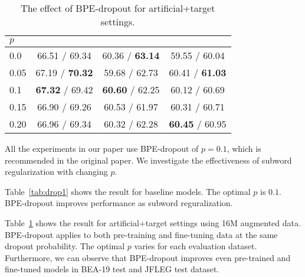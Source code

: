 \documentclass[11pt]{article}
\begin{document}
\begin{table}[t]
	\scriptsize
	\centering
	\tabcolsep 4pt
	\begin{tabular}{lccc}
		\hline
		$p$
		& \hspace{-1em}{$\def\arraystretch{0.5}\begin{array}{c}\vspace{-0.5em}\\\text{BEA-19}\\\text{test}\\\end{array}$}\hspace{-1em}
		& \hspace{-1em}{$\def\arraystretch{0.5}\begin{array}{c}\vspace{-0.5em}\\\text{CoNLL}\\\text{14}\\\end{array}$}\hspace{-1em}
		& \hspace{-1em}{$\def\arraystretch{0.5}\begin{array}{c}\vspace{-0.5em}\\\text{JFLEG}\\\text{test}\\\end{array}$}\hspace{-1em}
		\\ \hline
		0.0
		& 66.51 / 69.34
		& 60.36 / \textbf{63.14}
		& 59.55 / 60.04 \\
		0.05
		& 67.19 / \textbf{70.32}
		& 59.68 / 62.73
		& 60.41 / \textbf{61.03} \\
		0.1
		& \textbf{67.32} / 69.42
		& \textbf{60.60} / 62.25
		& 60.12 / 60.69 \\
		0.15
		& 66.90 / 69.26
		& 60.53 / 61.97
		& 60.31 / 60.71 \\
		0.20
		& 66.96 / 69.34
		& 60.32 / 62.28
		& \textbf{60.45} / 60.95 \\
		\hline
	\end{tabular}
	\caption{The effect of BPE-dropout for artificial+target settings.}
	\label{tab:drop2}
\end{table}

All the experiments in our paper use BPE-dropout of $p=0.1$, which is recommended in the original paper.
We investigate the effectiveness of subword regularization with changing $p$.

Table~\ref{tab:drop1} shows the result for baseline models.
The optimal $p$ is $0.1$.
BPE-dropout improves performance as subword reguralization.

Table~\ref{tab:drop2} shows the result for artificial+target settings using 16M augmented data.
BPE-dropout applies to both pre-training and fine-tuning data at the same dropout probability.
The optimal $p$ varies for each evaluation dataset.
Furthermore, we can observe that BPE-dropout improves even pre-trained and fine-tuned models in BEA-19 test and JFLEG test dataset.
\end{document}
